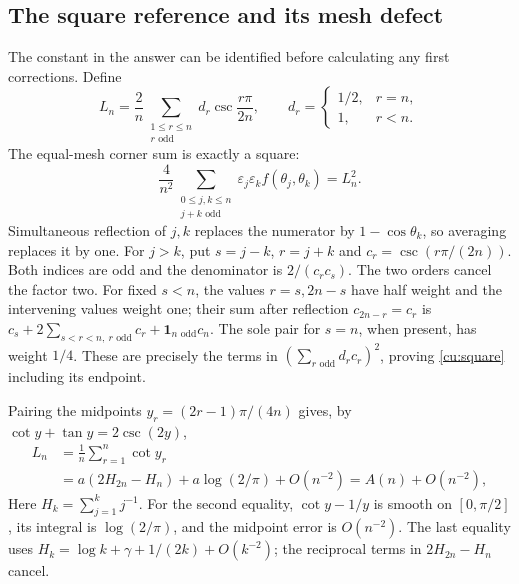\subsection{The square reference and its mesh defect}
The constant in the answer can be identified before calculating any
first corrections. Define
\[
 L_n=\frac2n\sum_{\substack{1\leq r\leq n\\r\text{ odd}}}
 d_r\csc\frac{r\pi}{2n},\qquad d_r=\begin{cases}1/2,&r=n,\\1,&r<n.\end{cases}
\]
The equal-mesh corner sum is exactly a square:
\begin{equation}\label{cu:square}
 \frac4{n^2}\sum_{\substack{0\leq j,k\leq n\\j+k\text{ odd}}}
 \varepsilon_j\varepsilon_k f(\theta_j,\theta_k)=L_n^2.
\end{equation}
Simultaneous reflection of $j,k$ replaces the numerator by $1-\cos\theta_k$,
so averaging replaces it by one. For $j>k$, put $s=j-k$, $r=j+k$ and
$c_r=\csc(r\pi/(2n))$. Both indices are odd and the denominator is
$2/(c_rc_s)$. The two orders cancel the factor two. For fixed $s<n$,
the values $r=s,2n-s$ have half weight and the intervening values weight
one; their sum after reflection $c_{2n-r}=c_r$ is
$c_s+2\sum_{s<r<n,\ r\text{ odd}}c_r+\boldsymbol1_{n\text{ odd}}c_n$.
The sole pair for $s=n$, when present, has weight $1/4$.
These are precisely the terms in $(\sum_{r\text{ odd}}d_rc_r)^2$,
proving \eqref{cu:square} including its endpoint.

Pairing the midpoints $y_r=(2r-1)\pi/(4n)$ gives, by
$\cot y+\tan y=2\csc(2y)$,
\[
 \begin{aligned}
 L_n&=\frac1n\sum_{r=1}^n\cot y_r\\
    &=a(2H_{2n}-H_n)+a\log(2/\pi)+O(n^{-2})=A(n)+O(n^{-2}),
 \end{aligned}
\]
Here $H_k=\sum_{j=1}^k j^{-1}$. For the second equality, $\cot y-1/y$
is smooth on $[0,\pi/2]$,
its integral is $\log(2/\pi)$, and the midpoint error is $O(n^{-2})$.
The last equality uses $H_k=\log k+\gamma+1/(2k)+O(k^{-2})$;
the reciprocal terms in $2H_{2n}-H_n$ cancel.

